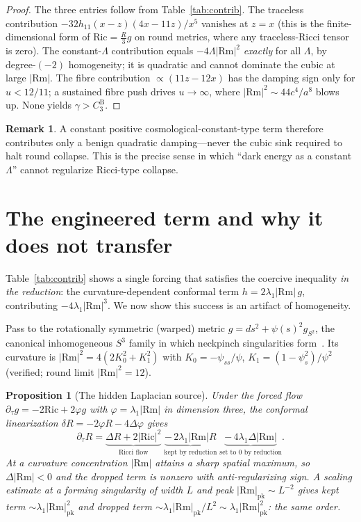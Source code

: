 \documentclass[aps,prd,twocolumn,superscriptaddress,nofootinbib,floatfix]{revtex4-2}
\theoremstyle{plain}
\newtheorem{proposition}{Proposition}
\theoremstyle{definition}
\newtheorem{remark}{Remark}
\newcommand{\Rm}{\mathrm{Rm}}
\newcommand{\Ric}{\mathrm{Ric}}
\newcommand{\dtau}{\partial_\tau}
\begin{document}
\begin{proof}
The three entries follow from Table~\ref{tab:contrib}. The traceless contribution $-32h_{11}(x-z)(4x-11z)/x^5$ vanishes at $z=x$ (this is the finite-dimensional form of $\Ric=\tfrac{R}{3}g$ on round metrics, where any traceless-Ricci tensor is zero). The constant-$\Lambda$ contribution equals $-4\Lambda|\Rm|^2$ \emph{exactly} for all $\Lambda$, by degree-$(-2)$ homogeneity; it is quadratic and cannot dominate the cubic at large $|\Rm|$. The fibre contribution $\propto(11z-12x)$ has the damping sign only for $u<12/11$; a sustained fibre push drives $u\to\infty$, where $|\Rm|^2\sim 44c^4/a^8$ blows up. None yields $\gamma>C_3^{\mathrm{B}}$.
\end{proof}

\begin{remark}
A constant positive cosmological-constant-type term therefore contributes only a benign quadratic damping---never the cubic sink required to halt round collapse. This is the precise sense in which ``dark energy as a constant $\Lambda$'' cannot regularize Ricci-type collapse.
\end{remark}

\section{The engineered term and why it does not transfer}\label{sec:transfer}

Table~\ref{tab:contrib} shows a single forcing that satisfies the coercive inequality \emph{in the reduction}: the curvature-dependent conformal term $h=2\lambda_1|\Rm|\,g$, contributing $-4\lambda_1|\Rm|^3$. We now show this success is an artifact of homogeneity.

Pass to the rotationally symmetric (warped) metric $g=ds^2+\psi(s)^2 g_{S^2}$, the canonical inhomogeneous $S^3$ family in which neckpinch singularities form~\cite{AngenentKnopf}. Its curvature is $|\Rm|^2=4(2K_0^2+K_1^2)$ with $K_0=-\psi_{ss}/\psi$, $K_1=(1-\psi_s^2)/\psi^2$ (verified; round limit $|\Rm|^2=12$).

\begin{proposition}[The hidden Laplacian source]\label{prop:hidden}
Under the forced flow $\dtau g=-2\Ric+2\varphi g$ with $\varphi=\lambda_1|\Rm|$ in dimension three, the conformal linearization $\delta R=-2\varphi R-4\Delta\varphi$ gives
\begin{equation}\label{eq:dR}
\dtau R=\underbrace{\Delta R+2|\Ric|^2}_{\text{Ricci flow}}\;\underbrace{-\,2\lambda_1|\Rm|R}_{\text{kept by reduction}}\;\underbrace{-\,4\lambda_1\Delta|\Rm|}_{\text{set to }0\text{ by reduction}}.
\end{equation}
At a curvature concentration $|\Rm|$ attains a sharp spatial maximum, so $\Delta|\Rm|<0$ and the dropped term is nonzero with anti-regularizing sign. A scaling estimate at a forming singularity of width $L$ and peak $|\Rm|_{\mathrm{pk}}\sim L^{-2}$ gives kept term $\sim\lambda_1|\Rm|_{\mathrm{pk}}^2$ and dropped term $\sim\lambda_1|\Rm|_{\mathrm{pk}}/L^2\sim\lambda_1|\Rm|_{\mathrm{pk}}^2$: the \emph{same order}.
\end{proposition}
\end{document}
